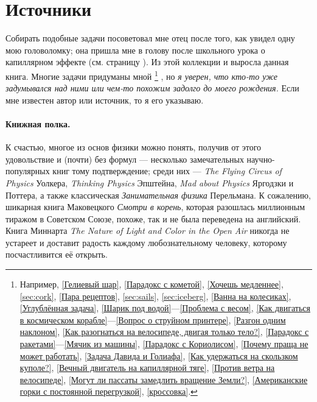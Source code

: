 \section{Источники}

Собирать подобные задачи посоветовал мне отец после того, как увидел одну мою головоломку;
она пришла мне в голову после школьного урока о капиллярном эффекте (см. страницу \pageref{Вечный двигатель на капиллярной тяге}).
Из этой коллекции и выросла данная книга.
Многие задачи придуманы мной%
\footnote{Например,
\ref{Гелиевый шар}, \ref{Парадокс с кометой}, \ref{Хочешь медленнее},
\ref{sec:cork}, \ref{Пара рецептов}, \ref{sec:sails}, \ref{sec:iceberg},
\ref{Ванна на колесиках}, \ref{Углублённая задача}, \ref{Шарик под водой}---\ref{Проблема с весом},
\ref{Как двигаться в космическом корабле}---\ref{Вопрос о струйном принтере},
\ref{Разгон одним наклоном}, \ref{Как разогнаться на велосипеде, двигая только тело?}, \ref{Парадокс с ракетами}---\ref{Мячик из машины},
\ref{Парадокс с Кориолисом}, \ref{Почему праща не может работать}, \ref{Задача Давида и Голиафа},
\ref{Как удержаться на скользком куполе?},
\ref{Вечный двигатель на капиллярной тяге},
\ref{Против ветра на велосипеде},
\ref{Могут ли пассаты замедлить вращение Земли?},
\ref{Американские горки с постоянной перегрузкой}, \ref{кроссовка}.}%
, но \emph{я уверен, что кто-то уже задумывался над ними или чем-то похожим задолго до моего рождения.}
Если мне известен автор или источник, то я его указываю.

\paragraph{Книжная полка.}
К счастью, многое из основ физики можно понять, получив от этого удовольствие и (почти) без формул ---
несколько замечательных научно-популярных книг тому подтверждение;
среди них --- \emph{The Flying Circus of Physics} Уолкера,
\emph{Thinking Physics} Эпштейна,
\emph{Mad about Physics} Яргодзки и Поттера,
а также классическая \emph{Занимательная физика} Перельмана.
К сожалению, шикарная книга Маковецкого \emph{Смотри в корень}, которая разошлась миллионным тиражом в Советском Союзе, похоже, так и не была переведена на английский.
Книга Миннарта \emph{The Nature of Light and Color in the Open Air} никогда не устареет и доставит радость каждому любознательному человеку, которому посчастливится её открыть.
